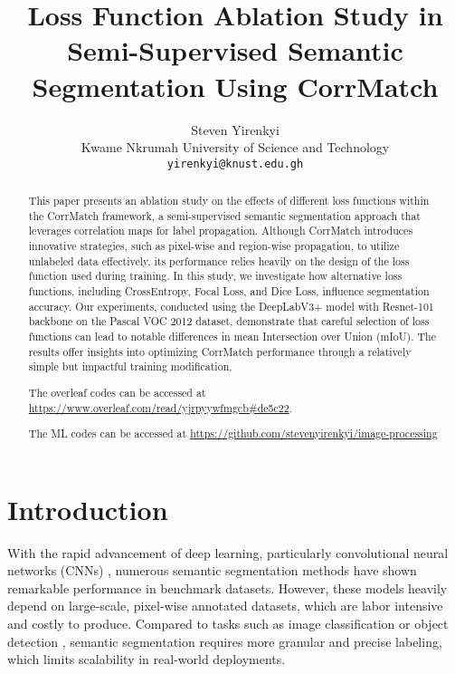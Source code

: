 \documentclass[10pt,twocolumn,letterpaper]{article}
\begin{document}
\title{Loss Function Ablation Study in Semi-Supervised Semantic Segmentation Using CorrMatch}

\author{Steven Yirenkyi\\
Kwame Nkrumah University of Science and Technology\\
{\tt\small yirenkyi@knust.edu.gh}
}
\maketitle

\begin{abstract}
  This paper presents an ablation study on the effects of different loss functions within the CorrMatch framework, a semi-supervised semantic segmentation approach that leverages correlation maps for label propagation. Although CorrMatch introduces innovative strategies, such as pixel-wise and region-wise propagation, to utilize unlabeled data effectively, its performance relies heavily on the design of the loss function used during training. In this study, we investigate how alternative loss functions, including CrossEntropy, Focal Loss, and Dice Loss, influence segmentation accuracy. Our experiments, conducted using the DeepLabV3+ model with Resnet-101 backbone on the Pascal VOC 2012 dataset, demonstrate that careful selection of loss functions can lead to notable differences in mean Intersection over Union (mIoU). The results offer insights into optimizing CorrMatch performance through a relatively simple but impactful training modification.

  The overleaf codes can be accessed at \url{https://www.overleaf.com/read/yjrpyywfmgcb#de5c22}. 

  The ML codes can be accessed at \url{https://github.com/stevenyirenkyi/image-processing}
\end{abstract}

\section{Introduction}
\label{sec:intro}
With the rapid advancement of deep learning, particularly convolutional neural networks (CNNs) \cite{gao2019res2net, gao2022rf, he2016deep, wei2023cat}, numerous semantic segmentation methods \cite{chen2018encoder, gong2022erroneous,guo2022segnext, jiang2023deep} have shown remarkable performance in benchmark datasets. However, these models heavily depend on large-scale, pixel-wise annotated datasets, which are labor intensive and costly to produce. Compared to tasks such as image classification or object detection \cite{deng2009imagenet,lin2014microsoft}, semantic segmentation requires more granular and precise labeling, which limits scalability in real-world deployments.
\end{document}
